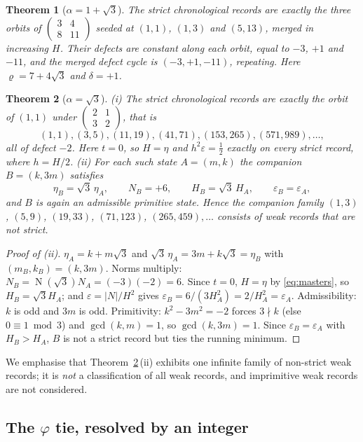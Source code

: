 \documentclass[11pt]{article}
\newtheorem{theorem}{Theorem}[section]
\theoremstyle{definition}
\theoremstyle{remark}
\newcommand{\pr}{\varrho}
\DeclareMathOperator{\Nm}{N}
\newcommand{\mat}[4]{\left(\begin{smallmatrix}#1&#2\\#3&#4\end{smallmatrix}\right)}
\begin{document}
\begin{theorem}[$\alpha=1+\sqrt3$]\label{thm:B}
The strict chronological records are exactly the three orbits of
$\mat{3}{4}{8}{11}$ seeded at $(1,1)$, $(1,3)$ and $(5,13)$, merged in increasing $H$.
Their defects are constant along each orbit, equal to $-3$, $+1$ and $-11$, and the merged
defect cycle is $(-3,+1,-11)$, repeating. Here $\pr=7+4\sqrt3$ and $\delta=+1$.
\end{theorem}

\begin{theorem}[$\alpha=\sqrt3$]\label{thm:C}
\emph{(i)} The strict chronological records are exactly the orbit of $(1,1)$ under
$\mat{2}{1}{3}{2}$, that is
\[
(1,1),(3,5),(11,19),(41,71),(153,265),(571,989),\dots,
\]
all of defect $-2$. Here $t=0$, so $H=\eta$ and $h^2\varepsilon=\tfrac12$ exactly on every
strict record, where $h=H/2$.
\emph{(ii)} For each such state $A=(m,k)$ the companion $B=(k,3m)$ satisfies
\[
\eta_B=\sqrt3\,\eta_A,\qquad N_B=+6,\qquad H_B=\sqrt3\,H_A,\qquad \varepsilon_B=\varepsilon_A ,
\]
and $B$ is again an admissible primitive state. Hence the companion family
$(1,3)$, $(5,9)$, $(19,33)$, $(71,123)$, $(265,459),\dots$ consists of \emph{weak} records
that are not strict.
\end{theorem}

\begin{proof}[Proof of (ii)]
$\eta_A=k+m\sqrt3$ and $\sqrt3\,\eta_A=3m+k\sqrt3=\eta_B$ with $(m_B,k_B)=(k,3m)$. Norms
multiply: $N_B=\Nm(\sqrt3)N_A=(-3)(-2)=6$. Since $t=0$, $H=\eta$ by \eqref{eq:masters}, so
$H_B=\sqrt3H_A$; and $\varepsilon=|N|/H^2$ gives
$\varepsilon_B=6/(3H_A^2)=2/H_A^2=\varepsilon_A$. Admissibility: $k$ is odd and $3m$ is odd.
Primitivity: $k^2-3m^2=-2$ forces $3\nmid k$ (else $0\equiv1\bmod3$) and $\gcd(k,m)=1$, so
$\gcd(k,3m)=1$. Since $\varepsilon_B=\varepsilon_A$ with $H_B>H_A$, $B$ is not a strict record
but ties the running minimum.
\end{proof}

We emphasise that Theorem~\ref{thm:C}\,(ii) exhibits one infinite family of non-strict weak
records; it is \emph{not} a classification of all weak records, and imprimitive weak records are
not considered.

\subsection{\texorpdfstring{The $\varphi$ tie, resolved by an integer}{The phi tie, resolved by an integer}}\label{sec:tie}
\end{document}
